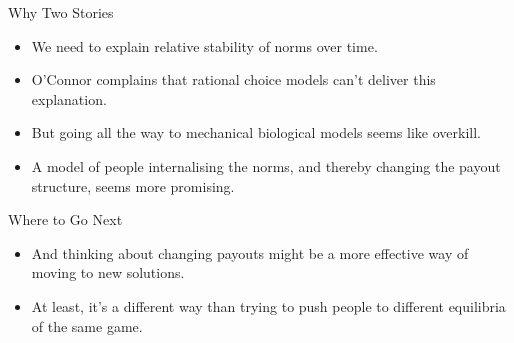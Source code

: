 \documentclass[
  ignorenonframetext,
]{beamer}
\providecommand{\tightlist}{%
  \setlength{\itemsep}{0pt}\setlength{\parskip}{0pt}}
\begin{document}
\begin{frame}{Why Two Stories}
\protect\hypertarget{why-two-stories}{}
\begin{itemize}
\tightlist
\item
  We need to explain relative stability of norms over time.
\item
  O'Connor complains that rational choice models can't deliver this
  explanation.
\item
  But going all the way to mechanical biological models seems like
  overkill.
\item
  A model of people internalising the norms, and thereby changing the
  payout structure, seems more promising.
\end{itemize}
\end{frame}

\begin{frame}{Where to Go Next}
\protect\hypertarget{where-to-go-next}{}
\begin{itemize}
\tightlist
\item
  And thinking about changing payouts might be a more effective way of
  moving to new solutions.
\item
  At least, it's a different way than trying to push people to different
  equilibria of the same game.
\end{itemize}
\end{frame}
\end{document}
